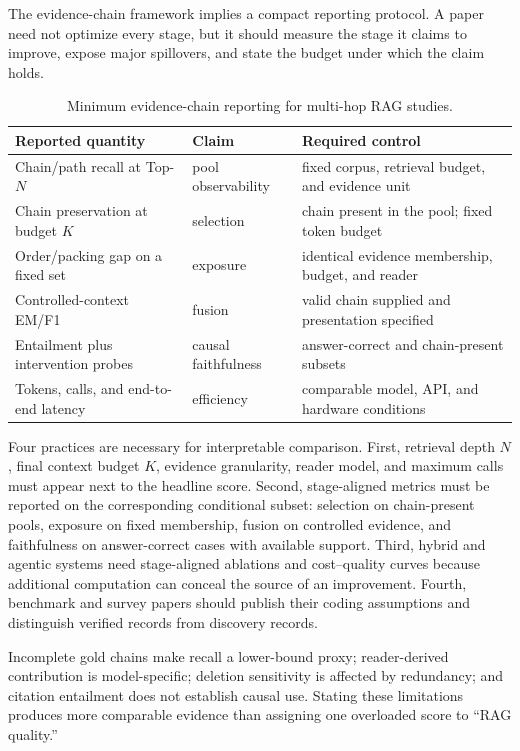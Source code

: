 \documentclass[manuscript,review]{acmart}
\theoremstyle{definition}
\theoremstyle{plain}
\theoremstyle{remark}
\begin{document}
The evidence-chain framework implies a compact reporting protocol. A paper
need not optimize every stage, but it should measure the stage it claims to
improve, expose major spillovers, and state the budget under which the claim
holds.

\begin{table}[t]
\caption{Minimum evidence-chain reporting for multi-hop RAG studies.}
\label{tab:minimum_reporting}
\centering
\footnotesize
\begin{tabularx}{\linewidth}{@{}p{2.8cm}p{2.1cm}Y@{}}
\toprule
Reported quantity & Claim & Required control \\
\midrule
Chain/path recall at Top-$N$ & pool observability & fixed corpus, retrieval budget, and evidence unit \\
Chain preservation at budget $K$ & selection & chain present in the pool; fixed token budget \\
Order/packing gap on a fixed set & exposure & identical evidence membership, budget, and reader \\
Controlled-context EM/F1 & fusion & valid chain supplied and presentation specified \\
Entailment plus intervention probes & causal faithfulness & answer-correct and chain-present subsets \\
Tokens, calls, and end-to-end latency & efficiency & comparable model, API, and hardware conditions \\
\bottomrule
\end{tabularx}
\end{table}

Four practices are necessary for interpretable comparison. First,
retrieval depth $N$, final context budget $K$, evidence granularity, reader
model, and maximum calls must appear next to the headline score. Second,
stage-aligned metrics must be reported on the corresponding conditional subset:
selection on chain-present pools, exposure on fixed membership, fusion on
controlled evidence, and faithfulness on answer-correct cases with available
support. Third, hybrid and agentic systems need stage-aligned ablations and
cost--quality curves because additional computation can conceal the source of
an improvement. Fourth, benchmark and survey papers should publish their
coding assumptions and distinguish verified records from discovery records.

Incomplete gold chains make recall a lower-bound proxy; reader-derived
contribution is model-specific; deletion sensitivity is affected by
redundancy; and citation entailment does not establish causal use. Stating
these limitations produces more comparable evidence than assigning one
overloaded score to ``RAG quality.''
\end{document}
